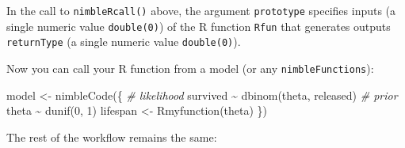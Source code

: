 \documentclass[
  12pt,
]{krantz}
\newenvironment{Shaded}{\begin{snugshade}}{\end{snugshade}}
\newcommand{\CommentTok}[1]{\textcolor[rgb]{0.56,0.35,0.01}{\textit{#1}}}
\newcommand{\DecValTok}[1]{\textcolor[rgb]{0.00,0.00,0.81}{#1}}
\newcommand{\FunctionTok}[1]{\textcolor[rgb]{0.00,0.00,0.00}{#1}}
\newcommand{\NormalTok}[1]{#1}
\newcommand{\OtherTok}[1]{\textcolor[rgb]{0.56,0.35,0.01}{#1}}
\newcommand{\SpecialCharTok}[1]{\textcolor[rgb]{0.00,0.00,0.00}{#1}}
\begin{document}
In the call to \texttt{nimbleRcall()} above, the argument \texttt{prototype} specifies inputs (a single numeric value \texttt{double(0)}) of the R function \texttt{Rfun} that generates outputs \texttt{returnType} (a single numeric value \texttt{double(0)}).

Now you can call your R function from a model (or any \texttt{nimbleFunctions}):

\begin{Shaded}
\begin{Highlighting}[]
\NormalTok{model }\OtherTok{\textless{}{-}} \FunctionTok{nimbleCode}\NormalTok{(\{}
  \CommentTok{\# likelihood}
\NormalTok{  survived }\SpecialCharTok{\textasciitilde{}} \FunctionTok{dbinom}\NormalTok{(theta, released)}
  \CommentTok{\# prior}
\NormalTok{  theta }\SpecialCharTok{\textasciitilde{}} \FunctionTok{dunif}\NormalTok{(}\DecValTok{0}\NormalTok{, }\DecValTok{1}\NormalTok{)}
\NormalTok{  lifespan }\OtherTok{\textless{}{-}} \FunctionTok{Rmyfunction}\NormalTok{(theta)}
\NormalTok{\})}
\end{Highlighting}
\end{Shaded}

The rest of the workflow remains the same:
\end{document}
